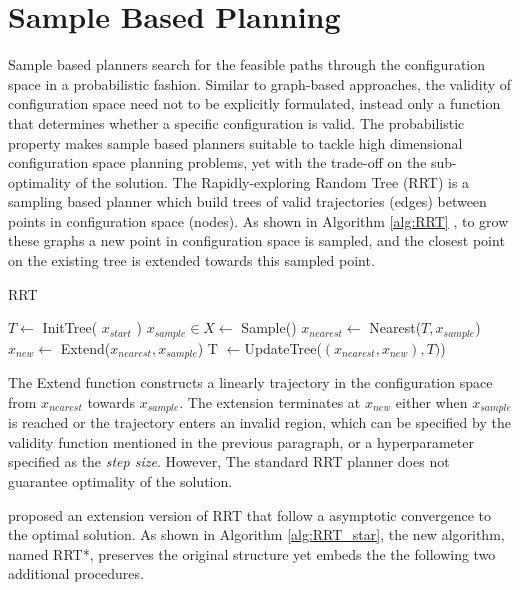 \documentclass[../thesis.tex]{subfiles}
\begin{document}
\section{Sample Based Planning}
\label{sec:sample_based_planning}

Sample based planners search for the feasible paths through the configuration space in a probabilistic fashion. 
Similar to graph-based approaches, the validity of configuration space need not to be explicitly formulated, instead only a function that determines whether a specific configuration is valid. 
The probabilistic property makes sample based planners suitable to tackle high dimensional configuration space planning problems, yet with the trade-off on the sub-optimality of the solution. 
The Rapidly-exploring Random Tree (RRT) is a sampling based planner which build trees of valid trajectories (edges) between points in configuration space (nodes).
As shown in Algorithm \ref{alg:RRT} \cite{lavalle1998rapidly}, to grow these graphs a new point in configuration space is sampled, and the closest point on the existing tree is extended towards this sampled point.

\begin{algorithm}
  \caption{RRT} \label{alg:RRT}
  \begin{algorithmic}[1]
    \State $T \leftarrow$ InitTree( $x_{start}$ )
	    \State $x_{sample} \in X \leftarrow$ Sample()
	    \State $x_{nearest} \leftarrow $ Nearest($T, x_{sample}$)
	    \State $x_{new} \leftarrow $ Extend($x_{nearest}, x_{sample}$)
	    \State T $\leftarrow $UpdateTree($(x_{nearest},x_{new}), T)$)
    \EndWhile
  \end{algorithmic}
\end{algorithm}

The Extend function constructs a linearly trajectory in the configuration space from $x_{nearest}$ towards $x_{sample}$. 
The extension terminates at $x_{new}$ either when $x_{sample}$ is reached or the trajectory enters an invalid region, which can be specified by the validity function mentioned in the previous paragraph, or a hyperparameter specified as the \textit{step size}. 
However, The standard RRT planner does not guarantee optimality of the solution. 

\citet{karaman2011sampling} proposed an extension version of RRT that follow a asymptotic convergence to the optimal solution. 
As shown in Algorithm \ref{alg:RRT_star}, the new algorithm, named RRT*, preserves the original structure yet embeds the the following two additional procedures.
\end{document}
